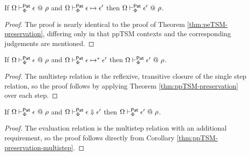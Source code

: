 \begin{theorem}
\label{thm:ppTSM-preservation}
If $\Omega \vdash_{\Phi}^{\mathsf{Pat}} \epsilon ~@~ \rho$ and $\Omega \vdash_{\Phi}^\mathsf{Pat} \epsilon \mapsto \epsilon'$ then $\Omega \vdash_{\Phi}^{\mathsf{Pat}} \epsilon' ~@~ \rho$.
\end{theorem}
\begin{proof} The proof is nearly identical to the proof of Theorem \ref{thm:peTSM-preservation}, differing only in that ppTSM contexts and the corresponding judgements are mentioned. \end{proof}

\begin{corollary}
\label{thm:ppTSM-preservation-multistep}
If $\Omega \vdash_{\Phi}^{\mathsf{Pat}} \epsilon ~@~ \rho$ and $\Omega \vdash_{\Phi}^\mathsf{Pat} \epsilon \mapsto^{*} \epsilon'$ then $\Omega \vdash_{\Phi}^{\mathsf{Pat}} \epsilon' ~@~ \rho$.
\end{corollary}
\begin{proof} The multistep relation is the reflexive, transitive closure of the single step relation, so the proof follows by applying Theorem \ref{thm:ppTSM-preservation} over each step. \end{proof}

\begin{corollary}
\label{thm:ppTSM-preservation-evaluation}
If $\Omega \vdash_{\Phi}^{\mathsf{Pat}} \epsilon ~@~ \rho$ and $\Omega \vdash_{\Phi}^\mathsf{Pat} \epsilon \Downarrow \epsilon'$ then $\Omega \vdash_{\Phi}^{\mathsf{Pat}} \epsilon' ~@~ \rho$.
\end{corollary}
\begin{proof} The evaluation relation is the multistep relation with an additional requirement, so the proof follows directly from Corollary \ref{thm:ppTSM-preservation-multistep}. \end{proof}


